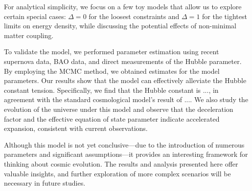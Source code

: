 \documentclass[a4paper,fleqn]{cas-sc}
\begin{document}
For analytical simplicity, we focus on a few toy models that allow us to explore certain special cases: $\Delta=0$ for the loosest constraints and $\Delta=1$ for the tightest limits on energy density, while discussing the potential effects of non-minimal matter coupling.

To validate the model, we performed parameter estimation using recent supernova data, BAO data, and direct measurements of the Hubble parameter. By employing the MCMC method, we obtained estimates for the model parameters. Our results show that the model can effectively alleviate the Hubble constant tension. Specifically, we find that the Hubble constant is ..., in agreement with the standard cosmological model's result of .... We also study the evolution of the universe under this model and observe that the deceleration factor and the effective equation of state parameter indicate accelerated expansion, consistent with current observations.

Although this model is not yet conclusive—due to the introduction of numerous parameters and significant assumptions—it provides an interesting framework for thinking about cosmic evolution. The results and analysis presented here offer valuable insights, and further exploration of more complex scenarios will be necessary in future studies.







\end{document}
